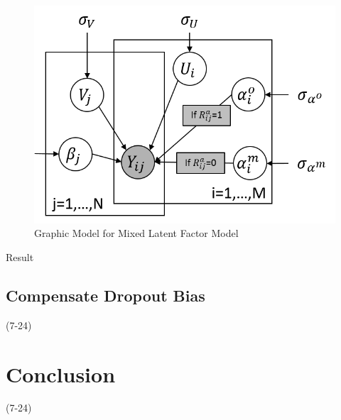 \documentclass[preprint,12pt]{elsarticle}
\begin{document}
\begin{figure}[!htb]
\centering
\includegraphics[scale=0.6]{MLFM.png}
\caption{Graphic Model for Mixed Latent Factor Model}
\label{fig:MLFM}
\end{figure}

Result 

\subsection{Compensate Dropout Bias} (7-24)

\section{Conclusion} (7-24)
\end{document}
